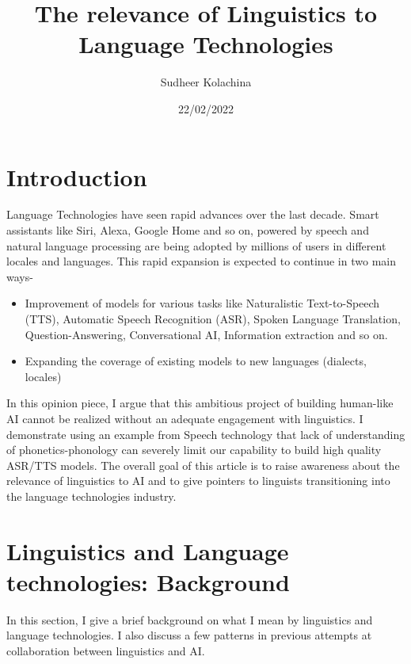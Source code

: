 \documentclass{article}
\title{The relevance of Linguistics to Language Technologies}
\author{Sudheer Kolachina}
\date{22/02/2022}
\begin{document}
\maketitle

\section{Introduction}

Language Technologies have seen rapid advances over the last decade. Smart assistants like Siri, Alexa, Google Home and so on, powered by speech and natural language processing are being adopted by millions of users in different locales and languages. This rapid expansion is expected to continue in two main ways- 
\begin{itemize}
    \item Improvement of models for various tasks like Naturalistic Text-to-Speech (TTS), Automatic Speech Recognition (ASR), Spoken Language Translation,  Question-Answering, Conversational AI, Information extraction and so on. 
    \item Expanding the coverage of existing models to new languages (dialects, locales)
\end{itemize}

In this opinion piece, I argue that this ambitious project of building human-like AI cannot be realized without an adequate engagement with linguistics. I demonstrate using an example from Speech technology that lack of understanding of phonetics-phonology can severely limit our capability to build high quality ASR/TTS models. The overall goal of this article is to raise awareness about the relevance of linguistics to AI and to give pointers to linguists transitioning into the language technologies industry. 
\section{Linguistics and Language technologies: Background}

In this section, I give a brief background on what I mean by linguistics and language technologies. I also discuss a few patterns in previous attempts at collaboration between linguistics and AI. 
\end{document}
